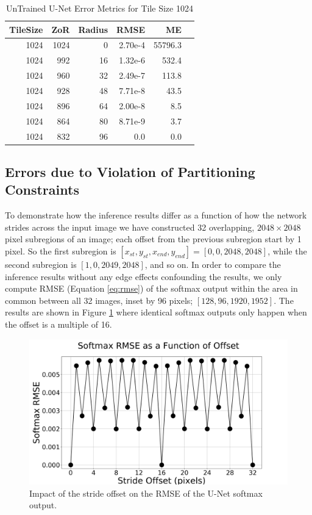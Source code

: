 \documentclass[letterpaper]{article} %
\begin{document}
\begin{table}[h!]
	\centering
\caption{UnTrained U-Net Error Metrics for Tile Size 1024}
\label{tab:tile_size_1024}
\begin{tabular}{rrrrrr}
	TileSize & ZoR & Radius & RMSE   & ME \\ 
	\hline
1024 & 1024 & 0 & 2.70e-4 & 55796.3 \\
1024 & 992 & 16 & 1.32e-6 & 532.4 \\
1024 & 960 & 32 & 2.49e-7 & 113.8 \\
1024 & 928 & 48 & 7.71e-8 & 43.5 \\
1024 & 896 & 64 & 2.00e-8 & 8.5 \\
1024 & 864 & 80 & 8.71e-9 & 3.7 \\
1024 & 832 & 96 & 0.0 & 0.0 \\
\end{tabular}
\end{table}


\subsection{Errors due to Violation of Partitioning Constraints}

To demonstrate how the inference results differ as a function of how the network strides across the input image we have constructed 32 overlapping, $2048 \times 2048$ pixel subregions of an image; each offset from the previous subregion start by 1 pixel. So the first subregion is $[x_{st}, y_{st}, x_{end}, y_{end}] = [0, 0, 2048, 2048]$, while the second subregion is $[1, 0, 2049, 2048]$, and so on. In order to compare the inference results without any edge effects confounding the results, we only compute RMSE (Equation \ref{eq:rmse}) of the softmax output within the area in common between all 32 images, inset by 96 pixels; $[128, 96, 1920, 1952]$. The results are shown in Figure \ref{fig:stride-impact} where identical softmax outputs only happen when the offset is a multiple of 16.

\begin{figure}[h!]
		\centering
		\includegraphics[width=0.8\linewidth]{figs/stride_impact.png}

	\caption{Impact of the stride offset on the RMSE of the U-Net softmax output.}
	\label{fig:stride-impact}
\end{figure} 
\end{document}
